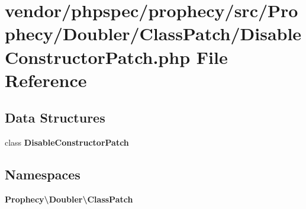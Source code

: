 \section{vendor/phpspec/prophecy/src/\+Prophecy/\+Doubler/\+Class\+Patch/\+Disable\+Constructor\+Patch.php File Reference}
\label{_disable_constructor_patch_8php}
\subsection*{Data Structures}
\begin{DoxyCompactItemize}
\item 
class {\bf Disable\+Constructor\+Patch}
\end{DoxyCompactItemize}
\subsection*{Namespaces}
\begin{DoxyCompactItemize}
\item 
 {\bf Prophecy\textbackslash{}\+Doubler\textbackslash{}\+Class\+Patch}
\end{DoxyCompactItemize}
